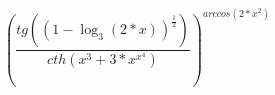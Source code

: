 \documentclass[a4paper]{article}
\begin{document}
\[
\left(\frac{tg\left(\left(1-\log_{3}\left(2*x\right)\right)^{\frac{1}{2}}\right)}{cth\left(x^{3}+3*x^{x^{4}}\right)}\right)^{arccos\left(2*x^{2}\right)}
\]
\end{document}
